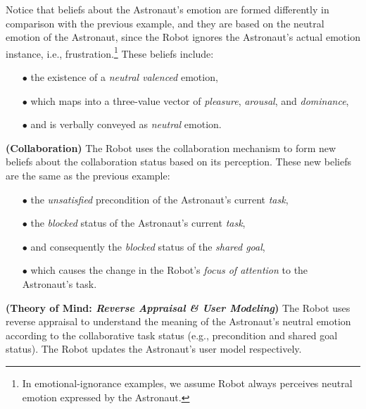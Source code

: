 \noindent Notice that beliefs about the Astronaut's emotion are formed
differently in comparison with the previous example, and they are based on the
neutral emotion of the Astronaut, since the Robot ignores the Astronaut's actual
emotion instance, i.e., frustration.\footnote{In emotional-ignorance examples,
we assume Robot always perceives neutral emotion expressed by the Astronaut.} These
beliefs include:

\begin{itemize}
  \item[$\bullet$] the existence of a \textit{neutral valenced} emotion,
  \item[$\bullet$] which maps into a three-value vector of \textit{pleasure},
  \textit{arousal}, and \textit{dominance},
  \item[$\bullet$] and is verbally conveyed as \textit{neutral} emotion.\\
\end{itemize}

\noindent\textbf{(Collaboration)} The Robot uses the collaboration mechanism to
form new beliefs about the collaboration status based on its perception. These
new beliefs are the same as the previous example:

\begin{itemize}
  \item[$\bullet$] the \textit{unsatisfied} precondition of the Astronaut's
  current \textit{task},
  \item[$\bullet$] the \textit{blocked} status of the Astronaut's current
  \textit{task},
  \item[$\bullet$] and consequently the \textit{blocked} status of the
  \textit{shared goal},
  \item[$\bullet$] which causes the change in the Robot's \textit{focus of
  attention} to the Astronaut's task.
\end{itemize}

\noindent\textbf{(Theory of Mind: \textit{Reverse Appraisal \& User Modeling})}
The Robot uses reverse appraisal to understand the meaning of the Astronaut's
neutral emotion according to the collaborative task status (e.g., precondition
and shared goal status). The Robot updates the Astronaut's user model
respectively.\\

